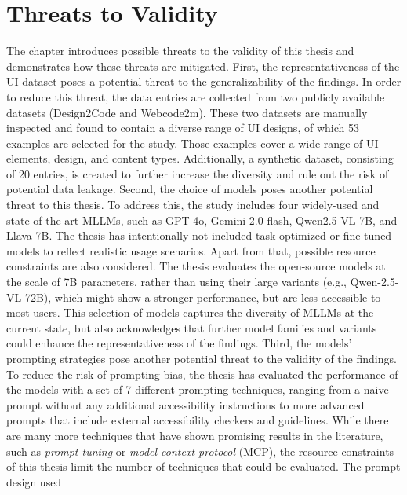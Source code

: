  \chapter{Threats to Validity}\label{chapter:threats}
The chapter introduces possible threats to the validity of 
this thesis and demonstrates how these threats 
are mitigated.\newline
First, the representativeness of the UI dataset poses 
a potential threat to the generalizability of the findings.
In order to reduce this threat, the data entries are 
collected from two publicly available datasets (Design2Code and Webcode2m).
These two datasets are manually inspected and found to contain a diverse 
range of UI designs, of which 53 examples are selected for the study. 
Those examples cover a wide range of UI elements, design, and 
content types. Additionally, a synthetic dataset, consisting of 
20 entries, is created to 
further increase the diversity and rule out the risk of 
potential data leakage.\newline 
Second, the choice of models poses another potential threat 
to this thesis. To address this, the study includes four widely-used 
and state-of-the-art MLLMs, such as GPT-4o, Gemini-2.0 flash, Qwen2.5-VL-7B,
and Llava-7B. The thesis has intentionally not included 
task-optimized or fine-tuned models to reflect realistic 
usage scenarios. Apart from that, possible resource constraints 
are also considered. The thesis evaluates the open-source 
models at the scale of 7B parameters, rather than using their 
large variants (e.g., Qwen-2.5-VL-72B), which might show 
a stronger performance, but are less accessible to most users.
This selection of models captures the diversity of MLLMs at 
the current state, but also acknowledges that further 
model families and variants could enhance the representativeness of the findings.\newline
Third, the models' prompting strategies pose another potential threat 
to the validity of the findings. To reduce the risk of 
prompting bias, the thesis has evaluated the performance of 
the models with a set of 7 different prompting techniques, 
ranging from a naive prompt without any additional accessibility instructions
to more advanced prompts that include external accessibility
checkers and guidelines. While there are many more techniques 
that have shown promising results in the literature, such as 
\textit{prompt tuning} or \textit{model context protocol} (MCP), 
the resource constraints of this thesis limit the number of
techniques that could be evaluated. The prompt design used 
